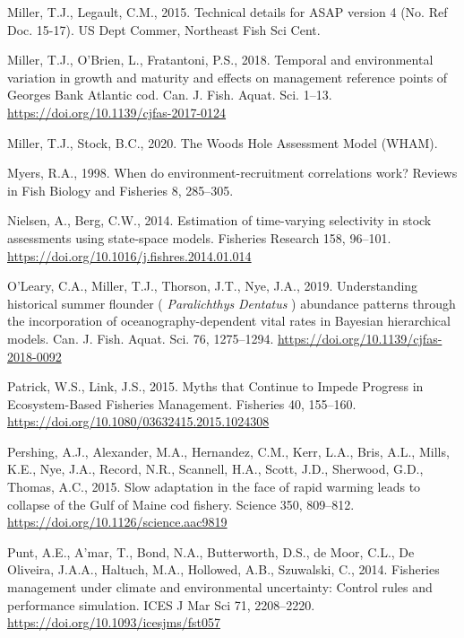 \documentclass[]{article}
\begin{document}
\leavevmode\hypertarget{ref-miller2015Technical}{}%
Miller, T.J., Legault, C.M., 2015. Technical details for ASAP version 4
(No. Ref Doc. 15-17). US Dept Commer, Northeast Fish Sci Cent.

\leavevmode\hypertarget{ref-miller2018Temporal}{}%
Miller, T.J., O'Brien, L., Fratantoni, P.S., 2018. Temporal and
environmental variation in growth and maturity and effects on management
reference points of Georges Bank Atlantic cod. Can. J. Fish. Aquat. Sci.
1--13. \url{https://doi.org/10.1139/cjfas-2017-0124}

\leavevmode\hypertarget{ref-miller2020Woods}{}%
Miller, T.J., Stock, B.C., 2020. The Woods Hole Assessment Model (WHAM).

\leavevmode\hypertarget{ref-myers1998When}{}%
Myers, R.A., 1998. When do environment-recruitment correlations work?
Reviews in Fish Biology and Fisheries 8, 285--305.

\leavevmode\hypertarget{ref-nielsen2014Estimation}{}%
Nielsen, A., Berg, C.W., 2014. Estimation of time-varying selectivity in
stock assessments using state-space models. Fisheries Research 158,
96--101. \url{https://doi.org/10.1016/j.fishres.2014.01.014}

\leavevmode\hypertarget{ref-oleary2019Understanding}{}%
O'Leary, C.A., Miller, T.J., Thorson, J.T., Nye, J.A., 2019.
Understanding historical summer flounder ( \emph{Paralichthys}
\emph{Dentatus} ) abundance patterns through the incorporation of
oceanography-dependent vital rates in Bayesian hierarchical models. Can.
J. Fish. Aquat. Sci. 76, 1275--1294.
\url{https://doi.org/10.1139/cjfas-2018-0092}

\leavevmode\hypertarget{ref-patrick2015Myths}{}%
Patrick, W.S., Link, J.S., 2015. Myths that Continue to Impede Progress
in Ecosystem-Based Fisheries Management. Fisheries 40, 155--160.
\url{https://doi.org/10.1080/03632415.2015.1024308}

\leavevmode\hypertarget{ref-pershing2015Slow}{}%
Pershing, A.J., Alexander, M.A., Hernandez, C.M., Kerr, L.A., Bris,
A.L., Mills, K.E., Nye, J.A., Record, N.R., Scannell, H.A., Scott, J.D.,
Sherwood, G.D., Thomas, A.C., 2015. Slow adaptation in the face of rapid
warming leads to collapse of the Gulf of Maine cod fishery. Science 350,
809--812. \url{https://doi.org/10.1126/science.aac9819}

\leavevmode\hypertarget{ref-punt2014Fisheries}{}%
Punt, A.E., A'mar, T., Bond, N.A., Butterworth, D.S., de Moor, C.L., De
Oliveira, J.A.A., Haltuch, M.A., Hollowed, A.B., Szuwalski, C., 2014.
Fisheries management under climate and environmental uncertainty:
Control rules and performance simulation. ICES J Mar Sci 71, 2208--2220.
\url{https://doi.org/10.1093/icesjms/fst057}
\end{document}
